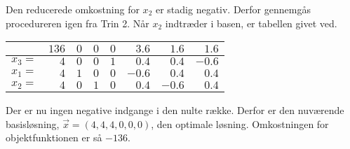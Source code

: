 \begin{eks}
\begin{center}
\end{center}
Den reducerede omkostning for $x_2$ er stadig negativ. Derfor gennemgås procedureren igen fra Trin 2. Når $x_2$ indtræder i basen, er tabellen givet ved. 
\begin{center}
\begin{tabular}{|r| r|r r r r r r|}
  \hline	
  &$136$&$0$ &$0$&$0$&$3.6$&$1.6$&$1.6$\\ \hline	
  $x_3=$&$4$&$0$&$0$&$1$&$0.4$&$0.4$&$-0.6$\\	
  $x_1=$&$4$&$1$&$0$&$0$&$-0.6$&$0.4$&$0.4$\\
  $x_2=$&$4$&$0$&$1$&$0$&$0.4$&$-0.6$&$0.4$\\
   \hline
\end{tabular}
\end{center}
Der er nu ingen negative indgange i den nulte række. Derfor er den nuværende basisløsning, $\vec{x}=(4,4,4,0,0,0)$, den optimale løsning. Omkostningen for objektfunktionen er så $-136$.
\end{eks}

